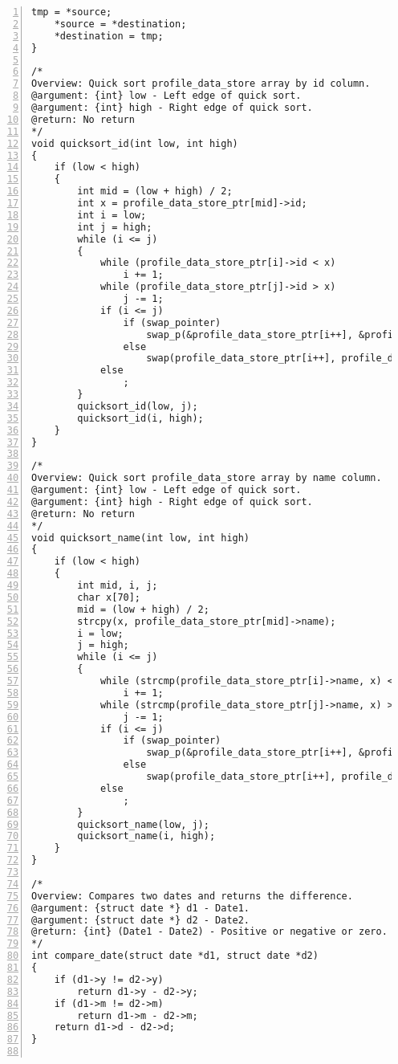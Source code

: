 \documentclass[autodetect-engine,dvi=dvipdfmx,ja=standard,
               a4j,11pt]{bxjsarticle}
\begin{document}
\begin{Verbatim}[numbers=left, xleftmargin=10mm, numbersep=6pt,
    fontsize=\small, baselinestretch=0.8]
    tmp = *source;
    *source = *destination;
    *destination = tmp;
}

/*
Overview: Quick sort profile_data_store array by id column.
@argument: {int} low - Left edge of quick sort.
@argument: {int} high - Right edge of quick sort.
@return: No return
*/
void quicksort_id(int low, int high)
{
    if (low < high)
    {
        int mid = (low + high) / 2;
        int x = profile_data_store_ptr[mid]->id;
        int i = low;
        int j = high;
        while (i <= j)
        {
            while (profile_data_store_ptr[i]->id < x)
                i += 1;
            while (profile_data_store_ptr[j]->id > x)
                j -= 1;
            if (i <= j)
                if (swap_pointer)
                    swap_p(&profile_data_store_ptr[i++], &profile_data_store_ptr[j--]);
                else
                    swap(profile_data_store_ptr[i++], profile_data_store_ptr[j--]);
            else
                ;
        }
        quicksort_id(low, j);
        quicksort_id(i, high);
    }
}

/*
Overview: Quick sort profile_data_store array by name column.
@argument: {int} low - Left edge of quick sort.
@argument: {int} high - Right edge of quick sort.
@return: No return
*/
void quicksort_name(int low, int high)
{
    if (low < high)
    {
        int mid, i, j;
        char x[70];
        mid = (low + high) / 2;
        strcpy(x, profile_data_store_ptr[mid]->name);
        i = low;
        j = high;
        while (i <= j)
        {
            while (strcmp(profile_data_store_ptr[i]->name, x) < 0)
                i += 1;
            while (strcmp(profile_data_store_ptr[j]->name, x) > 0)
                j -= 1;
            if (i <= j)
                if (swap_pointer)
                    swap_p(&profile_data_store_ptr[i++], &profile_data_store_ptr[j--]);
                else
                    swap(profile_data_store_ptr[i++], profile_data_store_ptr[j--]);
            else
                ;
        }
        quicksort_name(low, j);
        quicksort_name(i, high);
    }
}

/*
Overview: Compares two dates and returns the difference.
@argument: {struct date *} d1 - Date1.
@argument: {struct date *} d2 - Date2.
@return: {int} (Date1 - Date2) - Positive or negative or zero.
*/
int compare_date(struct date *d1, struct date *d2)
{
    if (d1->y != d2->y)
        return d1->y - d2->y;
    if (d1->m != d2->m)
        return d1->m - d2->m;
    return d1->d - d2->d;
}


\end{Verbatim}
\end{document}
